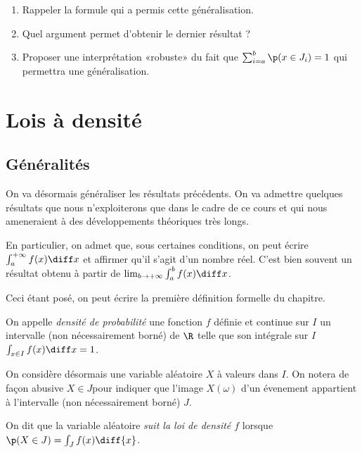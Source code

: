 \documentclass[11pt,a4paper,french]{article}
\begin{document}
\begin{question}
  \begin{enumerate}
    \item Rappeler la formule qui a permis cette généralisation.
    \item Quel argument permet d'obtenir le dernier résultat ?
    \item Proposer une interprétation «robuste» du fait que $\sum_{i =
      a}^b \p(x\in J_i) = 1$ qui permettra une généralisation.
  \end{enumerate}
\end{question}

\section{Lois à densité}

\subsection{Généralités}

On va désormais généraliser les résultats précédents. On va admettre
quelques résultats que nous n'exploiterons que dans le cadre de ce cours
et qui nous ameneraient à des développements théoriques très longs.

En particulier, on admet que, sous certaines conditions, on peut écrire
$\int_a^{+\infty}f(x)\diff x$ et affirmer qu'il s'agit d'un nombre réel.
C'est bien souvent un résultat obtenu à partir de
$\lim_{b\to+\infty}\int_a^b f(x) \diff x$.

Ceci étant posé, on peut écrire la première définition formelle du
chapitre.

\begin{definition}
  On appelle \emph{densité de probabilité} une fonction $f$ définie et
  continue sur $I$ un intervalle (non nécessairement borné) de $\R$
  telle que son intégrale sur $I$ $\int_{x\in I}f(x) \diff x = 1$.
\end{definition}

On considère désormais une variable aléatoire $X$ à valeurs dans $I$. On
notera de façon abusive $X \in J$pour indiquer que l'image $X(\omega)$
d'un évenement appartient à l'intervalle (non nécessairement borné) $J$.

\begin{definition}
  On dit que la variable aléatoire \emph{suit la loi de densité $f$}
  lorsque $\p(X\in J) = \int_{J} f(x)\diff{x}$.
\end{definition}
\end{document}

